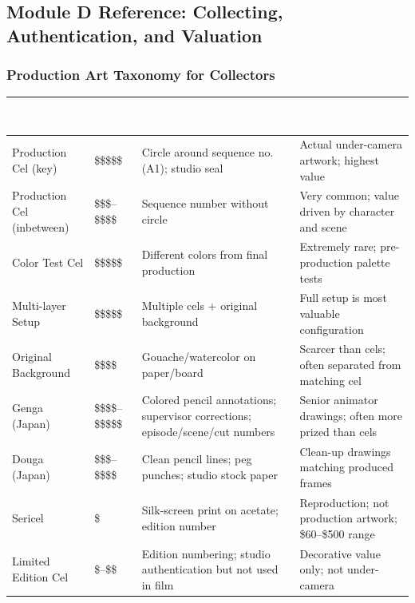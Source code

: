 \documentclass[11pt,letterpaper]{article}
\newcommand{\tableheader}[1]{\textbf{\sffamily\textcolor{white}{#1}}}
\begin{document}
\subsection{Module D Reference: Collecting, Authentication, and Valuation}

\subsubsection{Production Art Taxonomy for Collectors}

\begin{center}
\begin{tabularx}{\textwidth}{L{3cm}L{2cm}L{2.5cm}X}
\toprule
{}
\tableheader{Type} & \tableheader{Value Tier} & \tableheader{Identifying Marks} & \tableheader{Notes} \\
\midrule
Production Cel (key) & \$\$\$\$\$ & Circle around sequence no. (A1); studio seal & Actual under-camera artwork; highest value \\
Production Cel (inbetween) & \$\$\$--\$\$\$\$ & Sequence number without circle & Very common; value driven by character and scene \\
Color Test Cel & \$\$\$\$\$ & Different colors from final production & Extremely rare; pre-production palette tests \\
Multi-layer Setup & \$\$\$\$\$ & Multiple cels + original background & Full setup is most valuable configuration \\
Original Background & \$\$\$\$ & Gouache/watercolor on paper/board & Scarcer than cels; often separated from matching cel \\
Genga (Japan) & \$\$\$\$--\$\$\$\$\$ & Colored pencil annotations; supervisor corrections; episode/scene/cut numbers & Senior animator drawings; often more prized than cels \\
Douga (Japan) & \$\$\$--\$\$\$\$ & Clean pencil lines; peg punches; studio stock paper & Clean-up drawings matching produced frames \\
Sericel & \$ & Silk-screen print on acetate; edition number & Reproduction; not production artwork; \$60--\$500 range \\
Limited Edition Cel & \$--\$\$ & Edition numbering; studio authentication but not used in film & Decorative value only; not under-camera \\
\bottomrule
\end{tabularx}
\end{center}
\end{document}
